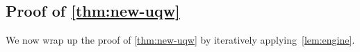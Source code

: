 \subsection{Proof of \cref{thm:new-uqw}}
We now wrap up the proof of \cref{thm:new-uqw} by iteratively applying~\cref{lem:engine}.

%
